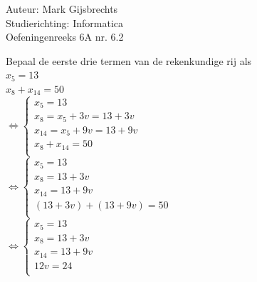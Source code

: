 \documentclass[a4paper]{article}
\begin{document}
\noindent \large Auteur: Mark Gijsbrechts \\
\noindent \large Studierichting: Informatica\\
\noindent \large Oefeningenreeks 6A nr. 6.2\\

\medskip

\normalsize



Bepaal de eerste drie termen van de rekenkundige rij als \\

$ x_{5} = 13 $ \\

$ x_{8} + x_{14} = 50 $ \\


$\Leftrightarrow \left\{
\begin{array}{l}
    x_{5} = 13 \\
	
    x_{8} = x_{5} + 3v = 13 + 3v \\
	
	x_{14} = x_{5} + 9v = 13 + 9v \\
	
	x_{8} + x_{14} = 50 \\
	
\end{array}
\right.$ \\

$\Leftrightarrow \left\{
\begin{array}{l}
    x_{5} = 13 \\
	
    x_{8} = 13 + 3v \\
	
	x_{14} = 13 + 9v \\
	
	\left( 13 + 3v \right) + \left( 13 + 9v \right) = 50 \\
	
\end{array}
\right.$ \\

$\Leftrightarrow \left\{
\begin{array}{l}
    x_{5} = 13 \\
	
    x_{8} = 13 + 3v \\
	
	x_{14} = 13 + 9v \\
	
	12v  = 24 \\
	
\end{array}
\right.$ \\
\end{document}

